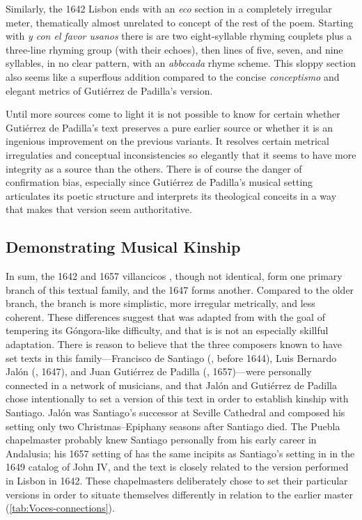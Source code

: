 Similarly, the 1642 Lisbon  ends with an \emph{eco} section in a
completely irregular meter, thematically almost unrelated to concept of the rest
of the poem.
Starting with \emph{y con el favor usanos} there is are two eight-syllable
rhyming couplets plus a three-line rhyming group (with their echoes), then lines
of five, seven, and nine syllables, in no clear pattern, with an \emph{abbccada}
rhyme scheme.
This sloppy section also seems like a superflous addition compared to the
concise \emph{conceptismo} and elegant metrics of Gutiérrez de Padilla's
version.

Until more sources come to light it is not possible to know for certain whether
Gutiérrez de Padilla's text preserves a pure earlier source or whether it is an
ingenious improvement on the previous variants.
It resolves certain metrical irregulaties and conceptual inconsistencies so
elegantly that it seems to have more integrity as a source than the others.
There is of course the danger of confirmation bias, especially since Gutiérrez
de Padilla's musical setting articulates its poetic structure and interprets its
theological conceits in a way that makes that version seem authoritative.

\subsection{Demonstrating Musical Kinship}

In sum, the 1642 and 1657 villancicos , though
not identical, form one primary branch of this textual family, and the 1647
 forms another.
Compared to the older  branch, the  branch is
more simplistic, more irregular metrically, and less coherent.
These differences suggest that  was adapted from 
with the goal of tempering its Góngora-like difficulty, and that is is not an
especially skillful adaptation.
There is reason to believe that the three composers known to have set texts in
this family---Francisco de Santiago (, before 1644), Luis Bernardo
Jalón (, 1647), and Juan Gutiérrez de Padilla (,
1657)---were personally connected in a network of musicians, and that Jalón and
Gutiérrez de Padilla chose intentionally to set a version of this text in order
to establish kinship with Santiago.
Jalón was Santiago's successor at Seville Cathedral and composed his
 setting only two Christmas--Epiphany seasons after Santiago
died.
The Puebla chapelmaster probably knew Santiago personally from his early career
in Andalusia; his 1657 setting of  has the same incipits as
Santiago's setting in in the 1649 catalog of John IV, and the text is closely
related to the version performed in Lisbon in 1642.
These chapelmasters deliberately chose to set their particular versions in order
to situate themselves differently in relation to the earlier master
(\cref{tab:Voces-connections}).

